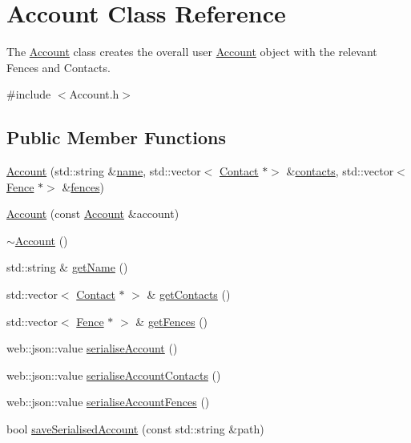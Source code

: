 \hypertarget{class_account}{}\section{Account Class Reference}
\label{class_account}


The \hyperlink{class_account}{Account} class creates the overall user \hyperlink{class_account}{Account} object with the relevant Fences and Contacts.  




{\ttfamily \#include $<$Account.\+h$>$}

\subsection*{Public Member Functions}
\begin{DoxyCompactItemize}
\item 
\hyperlink{class_account_a14f13a7a2e1d69d4b78c804603d69e1b}{Account} (std\+::string \&\hyperlink{class_account_a586e2c3461c5231eacf7c96851024a75}{name}, std\+::vector$<$ \hyperlink{class_contact}{Contact} $\ast$$>$ \&\hyperlink{class_account_aa4f77abd7c44f2a70b0cff8088e3491f}{contacts}, std\+::vector$<$ \hyperlink{class_fence}{Fence} $\ast$$>$ \&\hyperlink{class_account_ad92a9e8008371f34da06cd416a716fa1}{fences})
\item 
\hyperlink{class_account_af70ddede01cb2dc7acaec992769bf290}{Account} (const \hyperlink{class_account}{Account} \&account)
\item 
\hyperlink{class_account_a569c9ef0e42b9157690b4ceb646daba8}{$\sim$\+Account} ()
\item 
std\+::string \& \hyperlink{class_account_a1ef22885e8c6f145475c3306a4e6d74a}{get\+Name} ()
\item 
std\+::vector$<$ \hyperlink{class_contact}{Contact} $\ast$ $>$ \& \hyperlink{class_account_a53a9e366a589538552a368e3bbac2fd3}{get\+Contacts} ()
\item 
std\+::vector$<$ \hyperlink{class_fence}{Fence} $\ast$ $>$ \& \hyperlink{class_account_a5117acc0c4ef7be21c5339bd9ae84e40}{get\+Fences} ()
\item 
web\+::json\+::value \hyperlink{class_account_a1e9b184e8a6ddf67e8814e6c575f657e}{serialise\+Account} ()
\item 
web\+::json\+::value \hyperlink{class_account_a7f2d9836817ee851f723f6d3b1ff74a5}{serialise\+Account\+Contacts} ()
\item 
web\+::json\+::value \hyperlink{class_account_a426837a406852a6e6b11eda85828fc58}{serialise\+Account\+Fences} ()
\item 
bool \hyperlink{class_account_a9ff3a257536bc933e0a39207bb89243d}{save\+Serialised\+Account} (const std\+::string \&path)
\end{DoxyCompactItemize}
